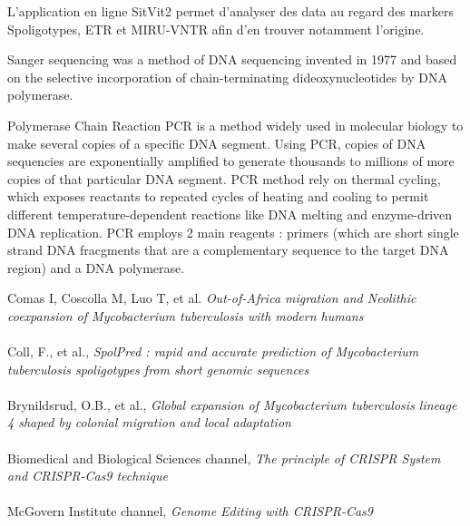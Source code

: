 \documentclass[twoside,a4paper,12pt,frenchb,openany]{report}
\begin{document}
L'application en ligne SitVit2 permet d'analyser des data au regard des markers Spoligotypes, ETR et MIRU-VNTR afin d'en trouver notamment l'origine.

Sanger sequencing was a method of DNA sequencing invented in 1977 and based on the selective incorporation of chain-terminating dideoxynucleotides by DNA polymerase.

Polymerase Chain Reaction PCR is a method widely used in molecular biology to make several copies of a specific DNA segment. Using PCR, copies of DNA sequencies are exponentially amplified to generate thousands to millions of more copies of that particular DNA segment. PCR method rely on thermal cycling, which exposes reactants to repeated cycles of heating and cooling to permit different temperature-dependent reactions like DNA melting and enzyme-driven DNA replication. PCR employs 2 main reagents : primers (which are short single strand DNA fracgments that are a complementary sequence to the target DNA region) and a DNA polymerase.



\renewcommand{\bibname}{Références}
\begin{thebibliography}{10}
\bibitem{}Comas I, Coscolla M, Luo T, et al. \textit{Out-of-Africa migration and Neolithic coexpansion of Mycobacterium tuberculosis with modern humans}\\ \\

\bibitem{}Coll, F., et al., \textit{SpolPred : rapid and accurate prediction of Mycobacterium tuberculosis spoligotypes from short genomic sequences}\\ \\

\bibitem{}Brynildsrud, O.B., et al., \textit{Global expansion of Mycobacterium tuberculosis lineage 4 shaped by colonial migration and local adaptation}\\ \\

\bibitem{}Biomedical and Biological Sciences channel, \textit{The principle of CRISPR System and CRISPR-Cas9 technique}\\ \\

\bibitem{}McGovern Institute channel, \textit{Genome Editing with CRISPR-Cas9}\\ \\


\end{thebibliography}
\end{document}
